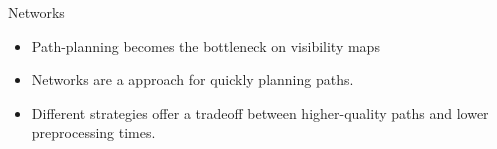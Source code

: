 \begin{frame}{Networks}
	\begin{itemize}
		\item Path-planning becomes the bottleneck on visibility maps
		\item Networks are a approach for quickly planning paths. 
		\item Different strategies offer a tradeoff between higher-quality paths and lower preprocessing times.
	\end{itemize}
	
\end{frame}

